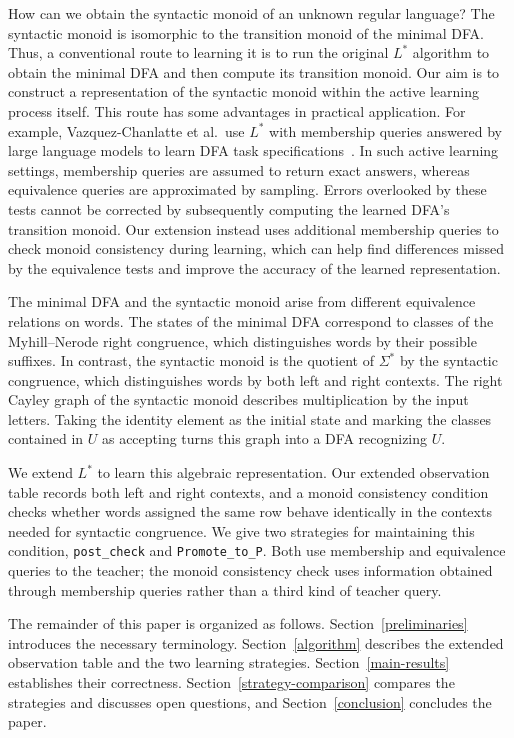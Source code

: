 \documentclass{ieice-tecrep}
\begin{document}
How can we obtain the syntactic monoid of an unknown regular language? 
The syntactic monoid is isomorphic to the transition monoid of the
minimal DFA. Thus, a conventional route to learning it is to run 
the original \(L^*\) algorithm to obtain the minimal DFA and then
compute its transition monoid. 
Our aim is to construct a 
representation of the syntactic monoid within the active learning
process itself. This route has some advantages in practical application. 
For example, Vazquez-Chanlatte et al.\ use \(L^*\) with membership
queries answered by large language models to learn DFA task
specifications~\cite{vazquezchanlatte2025lstarlm}. 
In such active learning settings, membership queries are assumed to return exact answers, whereas
equivalence queries are approximated by sampling. 
Errors overlooked by these tests cannot be corrected by subsequently
computing the learned DFA's transition monoid. Our extension instead
uses additional membership queries to check monoid consistency
during learning, which can help find differences missed by the
equivalence tests and improve the accuracy of the learned
representation.

The minimal DFA and the syntactic monoid arise from different equivalence relations
on words. The states of the minimal DFA correspond to classes of the
Myhill--Nerode right congruence, which distinguishes words by their
possible suffixes. In contrast, the syntactic monoid is the quotient
of \(\Sigma^*\) by the syntactic congruence, which distinguishes words by
both left and right contexts. The right Cayley graph of the syntactic monoid describes
multiplication by the input letters. Taking the identity element as
the initial state and marking the classes contained in \(U\) as
accepting turns this graph into a DFA recognizing \(U\).

We extend \(L^*\) to learn this algebraic representation. Our
extended observation table records both left and right contexts, and
a monoid consistency condition checks whether words assigned the same
row behave identically in the contexts needed for syntactic
congruence. We give two strategies for maintaining this condition,
\texttt{post\_check} and \texttt{Promote\_to\_P}. Both use membership
and equivalence queries to the teacher; the monoid consistency check
uses information obtained through membership queries rather than a
third kind of teacher query.

The remainder of this paper is organized as follows.
Section~\ref{preliminaries} introduces the necessary terminology.
Section~\ref{algorithm} describes the extended observation table and
the two learning strategies. Section~\ref{main-results} establishes
their correctness. Section~\ref{strategy-comparison} compares the
strategies and discusses open questions, and
Section~\ref{conclusion} concludes the paper.
\end{document}
